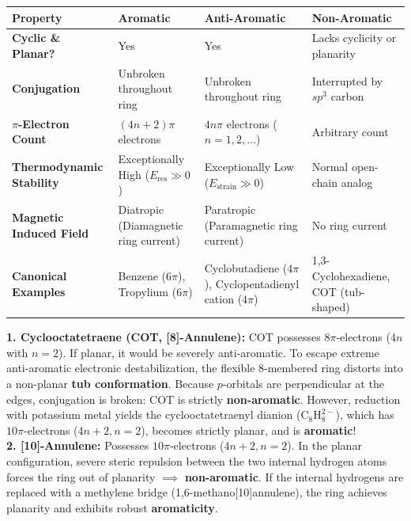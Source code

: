 \documentclass[10pt,a4paper]{article}
\begin{document}
\begin{formulabox}
\begin{tabularx}{\linewidth}{|l|Y|Y|Y|}
\hline
\textbf{Property} & \textbf{Aromatic} & \textbf{Anti-Aromatic} & \textbf{Non-Aromatic} \\
\hline
\textbf{Cyclic \& Planar?} & Yes & Yes & Lacks cyclicity or planarity \\
\hline
\textbf{Conjugation} & Unbroken throughout ring & Unbroken throughout ring & Interrupted by $sp^3$ carbon \\
\hline
\textbf{$\pi$-Electron Count} & $(4n+2)\pi$ electrons & $4n\pi$ electrons ($n=1,2,\dots$) & Arbitrary count \\
\hline
\textbf{Thermodynamic Stability} & Exceptionally High ($E_{\mathrm{res}} \gg 0$) & Exceptionally Low ($E_{\mathrm{strain}} \gg 0$) & Normal open-chain analog \\
\hline
\textbf{Magnetic Induced Field} & Diatropic (Diamagnetic ring current) & Paratropic (Paramagnetic ring current) & No ring current \\
\hline
\textbf{Canonical Examples} & Benzene ($6\pi$), Tropylium ($6\pi$) & Cyclobutadiene ($4\pi$), Cyclopentadienyl cation ($4\pi$) & 1,3-Cyclohexadiene, COT (tub-shaped) \\
\hline
\end{tabularx}
\end{formulabox}

\begin{trapbox}
\textbf{1. Cyclooctatetraene (COT, [8]-Annulene):}
COT possesses $8\pi$-electrons ($4n$ with $n=2$). If planar, it would be severely anti-aromatic. To escape extreme anti-aromatic electronic destabilization, the flexible 8-membered ring distorts into a non-planar \textbf{tub conformation}. Because $p$-orbitals are perpendicular at the edges, conjugation is broken: COT is strictly \textbf{non-aromatic}. However, reduction with potassium metal yields the cyclooctatetraenyl dianion ($\mathrm{C_8H_8^{2-}}$), which has $10\pi$-electrons ($4n+2, n=2$), becomes strictly planar, and is \textbf{aromatic}!\\
\textbf{2. [10]-Annulene:}
Possesses $10\pi$-electrons ($4n+2, n=2$). In the planar configuration, severe steric repulsion between the two internal hydrogen atoms forces the ring out of planarity $\implies$ \textbf{non-aromatic}. If the internal hydrogens are replaced with a methylene bridge (1,6-methano[10]annulene), the ring achieves planarity and exhibits robust \textbf{aromaticity}.
\end{trapbox}
\end{document}
